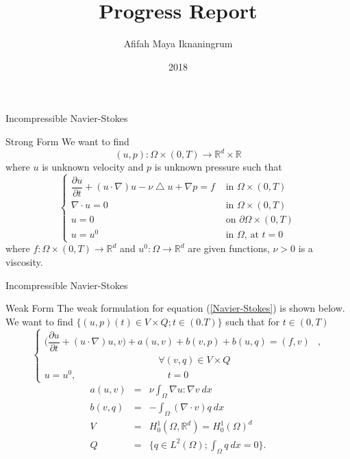 \documentclass{beamer}
\newcommand{\R}{\mathbb{R}}
\begin{document}
\title{Progress Report}
\author{Afifah Maya Iknaningrum}
\date{2018}

\begin{frame}
\titlepage
\end{frame}

\begin{frame}{Incompressible Navier-Stokes}
\begin{block}{Strong Form}
	We want to find \[(u,p) : \Omega \times (0,T) \rightarrow \R^d \times \R\] where $ u $ is unknown velocity and $ p $ is unknown pressure such that
	\begin{equation}\label{Navier-Stokes}
	\begin{cases}
	\dfrac{\partial u}{\partial t} + (u \cdot \nabla) u - \nu \bigtriangleup u + \nabla p = f & \text{ in } \Omega \times (0,T)\\
	\nabla \cdot u = 0 & \text{ in } \Omega \times (0,T)\\
	u = 0 & \text{ on } \partial \Omega \times (0,T)\\
	u = u^0 & \text{ in } \Omega \text{, at } t=0
	\end{cases}
	\end{equation}
	where $ f : \Omega \times (0,T) \rightarrow \R^d $ and $ u^0 : \Omega \rightarrow \R^d $ are given functions, $ \nu > 0 $ is a viscosity.
\end{block}
\end{frame}

\begin{frame}{Incompressible Navier-Stokes}
\begin{block}{Weak Form}
	The weak formulation for equation (\ref{Navier-Stokes}) is shown below. We want to find $ \{ (u,p)(t) \in V \times Q ; t \in (0.T) \} $ such that for $ t \in (0,T) $
	\begin{equation} \label{NS_Weak} \nonumber
	\begin{cases}
	\big( \dfrac{\partial u}{\partial t} + (u \cdot \nabla)u,v \big) + a(u,v) + b(v,p) + b(u,q) = (f,v) & , \\ \hspace{5cm} \forall(v,q)\in V\times Q \\ u=u^{0} , \hspace{4cm} t=0
	\end{cases}
	\end{equation}
	\begin{eqnarray}\nonumber
	a(u,v) &=& \nu \int_{\Omega} \nabla u : \nabla v \ dx \\ \nonumber
	b(v,q) &=& - \int_{\Omega} (\nabla \cdot v) q \ dx \\ \nonumber
	V &=& H_{0}^{1}(\Omega, \R^d) = H_{0}^{1}(\Omega)^d \\ \nonumber
	Q &=& \{ q\in L^2(\Omega) ; \int_{\Omega} q \ dx=0 \}.
	\end{eqnarray}
\end{block}
\end{frame}
\end{document}
